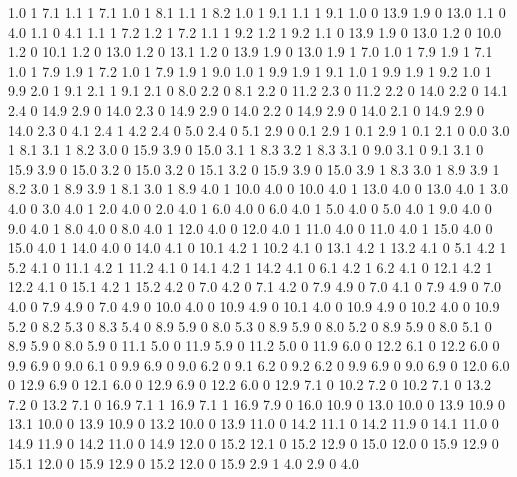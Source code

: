 1.0	1	7.1	1.1	1	7.1
1.0	1	8.1	1.1	1	8.2
1.0 	1 	9.1  	1.1 	1 	9.1
1.0	0	13.9	1.9	0	13.0
1.1 	0 	4.0  	1.1 	0 	4.1
1.1 	1 	7.2  	1.2 	1 	7.2
1.1	1	9.2	1.2	1	9.2
1.1	0	13.9	1.9	0	13.0
1.2	0	10.0	1.2	0	10.1
1.2	0	13.0	1.2	0	13.1
1.2	0	13.9	1.9	0	13.0
1.9	1	7.0	1.0	1	7.9
1.9	1	7.1	1.0	1	7.9
1.9	1	7.2	1.0	1	7.9
1.9	1	9.0	1.0	1	9.9
1.9	1	9.1	1.0	1	9.9
1.9	1	9.2	1.0	1	9.9
2.0	1	9.1	2.1	1	9.1
2.1	0 	8.0	2.2	0	8.1
2.2	0	11.2	2.3	0	11.2
2.2	0	14.0	2.2	0	14.1
2.4	0	14.9	2.9	0	14.0
2.3	0	14.9	2.9	0	14.0
2.2	0	14.9	2.9	0	14.0
2.1	0	14.9	2.9	0	14.0
2.3 	0	4.1	2.4	1	4.2
2.4	0	5.0	2.4	0	5.1
2.9	0	0.1	2.9	1	0.1
2.9	1	0.1	2.1	0	0.0
3.0	1	8.1	3.1	1	8.2
3.0	0	15.9	3.9	0	15.0
3.1	1	8.3	3.2	1	8.3
3.1	0	9.0	3.1	0	9.1
3.1	0	15.9	3.9	0	15.0
3.2	0	15.0	3.2	0	15.1
3.2	0	15.9	3.9	0	15.0
3.9	1	8.3	3.0	1	8.9
3.9	1	8.2	3.0	1	8.9
3.9	1	8.1	3.0	1	8.9
4.0	1	10.0	4.0	0	10.0
4.0	1	13.0	4.0	0	13.0
4.0	1	3.0	4.0	0	3.0
4.0	1	2.0	4.0	0	2.0
4.0	1	6.0	4.0	0	6.0
4.0	1	5.0	4.0	0	5.0
4.0	1	9.0	4.0	0	9.0
4.0	1	8.0	4.0	0	8.0
4.0	1	12.0	4.0	0	12.0
4.0	1	11.0	4.0	0	11.0
4.0	1	15.0	4.0	0	15.0
4.0	1	14.0	4.0	0	14.0
4.1	0	10.1	4.2	1	10.2
4.1	0	13.1	4.2	1	13.2
4.1	0	5.1	4.2	1	5.2
4.1	0	11.1	4.2	1	11.2
4.1	0	14.1	4.2	1	14.2
4.1	0	6.1	4.2	1	6.2
4.1	0	12.1	4.2	1	12.2
4.1	0	15.1	4.2	1	15.2
4.2	0	7.0	4.2	0	7.1
4.2	0	7.9	4.9	0	7.0
4.1	0	7.9	4.9	0	7.0
4.0	0	7.9	4.9	0	7.0
4.9	0	10.0	4.0	0	10.9
4.9	0	10.1	4.0	0	10.9
4.9	0	10.2	4.0	0	10.9
5.2	0	8.2	5.3	0	8.3
5.4	0	8.9	5.9	0	8.0
5.3	0	8.9	5.9	0	8.0
5.2	0	8.9	5.9	0	8.0
5.1	0	8.9	5.9	0	8.0
5.9	0	11.1	5.0	0	11.9
5.9	0	11.2	5.0	0	11.9
6.0	0	12.2	6.1	0	12.2
6.0	0	9.9	6.9	0	9.0
6.1	0	9.9	6.9	0	9.0
6.2	0	9.1	6.2	0	9.2
6.2	0	9.9	6.9	0	9.0
6.9	0	12.0	6.0	0	12.9
6.9	0	12.1	6.0	0	12.9
6.9	0	12.2	6.0	0	12.9
7.1	0	10.2	7.2	0	10.2
7.1	0	13.2	7.2	0	13.2
7.1	0	16.9	7.1	1	16.9
7.1	1	16.9	7.9	0	16.0
10.9	0	13.0	10.0	0	13.9
10.9	0	13.1	10.0	0	13.9
10.9	0	13.2	10.0	0	13.9
11.0	0	14.2	11.1	0	14.2
11.9	0	14.1	11.0	0	14.9
11.9	0	14.2	11.0	0	14.9
12.0	0	15.2	12.1	0	15.2
12.9	0	15.0	12.0	0	15.9
12.9	0	15.1	12.0	0	15.9
12.9	0	15.2	12.0	0	15.9
2.9    1         4.0     2.9  0       4.0